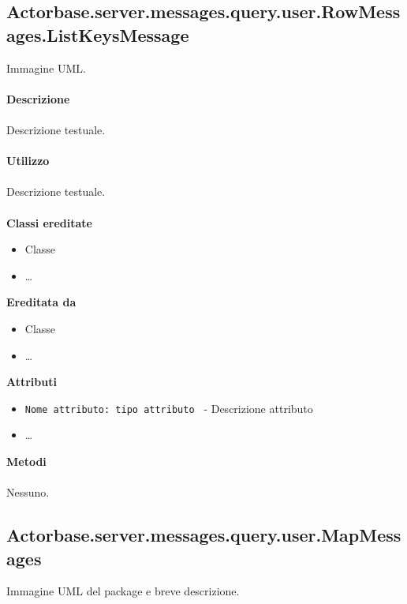 \documentclass[a4paper]{article}
\begin{document}
	\subsection{Actorbase.server.messages.query.user.RowMessages.ListKeysMessage}
		Immagine UML.
		\\ \\
		\textbf{Descrizione}
			\\ \\
			Descrizione testuale.
			\\ \\
		\textbf{Utilizzo}
			\\ \\
			Descrizione testuale.
			\\ \\
		\textbf{Classi ereditate}
			\begin{itemize}
				\item Classe
				\item \dots
			\end{itemize}
		\textbf{Ereditata da}
			\begin{itemize}
				\item Classe
				\item \dots
			\end{itemize}
		\textbf{Attributi}
			\begin{itemize}
				\item \texttt{Nome attributo: tipo attributo } - Descrizione attributo
				\item \dots
			\end{itemize}
		\textbf{Metodi}
			\\ \\
			Nessuno.	
			
	\subsection{Actorbase.server.messages.query.user.MapMessages}
		Immagine UML del package e breve descrizione.
		
\end{document}

